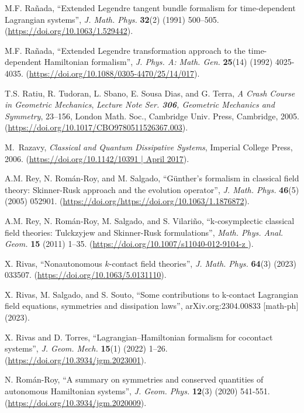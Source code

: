 \documentclass[12pt]{report}
\begin{document}
\begin{thebibliography}{999}
M.F. Ra\~nada,
 ``Extended Legendre tangent bundle formalism for time-dependent Lagrangian systems'', 
{\sl J. Math. Phys.} {\bf 32}(2) (1991) 500--505.
(\url{https://doi.org/10.1063/1.529442}).

M.F. Ra\~nada,
 ``Extended Legendre transformation approach to the time-dependent Hamiltonian formalism'', 
{\sl J. Phys. A: Math. Gen.} {\bf 25}(14) (1992) 4025-4035.
(\url{https://doi.org/10.1088/0305-4470/25/14/017}).

T.S. Ratiu, R. Tudoran, L. Sbano, E.
Sousa Dias, and G. Terra, 
{\it A Crash Course in Geometric Mechanics},  {\sl Lecture Note Ser.
{\bf 306}, Geometric Mechanics and Symmetry}, 23--156, London Math. Soc., Cambridge Univ.
Press, Cambridge, 2005.
(\url{https://doi.org/10.1017/CBO9780511526367.003}).

M.~Razavy,
{\em Classical and Quantum Dissipative Systems},
Imperial College Press, 2006.
(\url{https://doi.org/10.1142/10391 | April 2017}).

A.M. Rey, N. Rom\'{a}n-Roy, and M. Salgado,
``G\"{u}nther's formalism in classical
field theory: Skinner-Rusk approach and the evolution operator'',
{\sl J. Math. Phys.} {\bf 46}(5) (2005) 052901.
(\url{https://doi.org/https://doi.org/10.1063/1.1876872}).

A.M. Rey, N. Rom\'an-Roy, M. Salgado, and S. Vilari\~no,
``k-cosymplectic classical field theories: Tulckzyjew and Skinner-Rusk formulations'',
{\sl Math. Phys. Anal. Geom.} \textbf{15} (2011) 1--35.
(\url{https://doi.org/10.1007/s11040-012-9104-z }).

X. Rivas, 
``Nonautonomous $k$-contact field theories'', 
{\sl J. Math. Phys.} {\bf 64}(3) (2023) 033507.
(\url{https://doi.org/10.1063/5.0131110}).

X. Rivas, M. Salgado, and S. Souto,
``Some contributions to k-contact Lagrangian field equations, symmetries and dissipation laws'',
arXiv.org:2304.00833 [math-ph] (2023).

X. Rivas and D. Torres,
``Lagrangian--Hamiltonian formalism for cocontact systems'', {\sl J. Geom. Mech.} {\bf 15}(1) (2022) 1--26. (\url{https://doi.org/10.3934/jgm.2023001}).

N. Rom\'an-Roy,
``A summary on symmetries and conserved quantities of autonomous Hamiltonian systems'',
{\sl J. Geom. Phys.}  {\bf 12}(3) (2020) 541-551.
(\url{https://doi.org/10.3934/jgm.2020009}).


\end{thebibliography}
\end{document}
